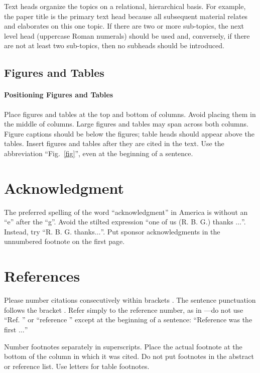 \documentclass[conference]{IEEEtran}
\begin{document}
Text heads organize the topics on a relational, hierarchical basis. For 
example, the paper title is the primary text head because all subsequent 
material relates and elaborates on this one topic. If there are two or more 
sub-topics, the next level head (uppercase Roman numerals) should be used 
and, conversely, if there are not at least two sub-topics, then no subheads 
should be introduced.

\subsection{Figures and Tables}
\paragraph{Positioning Figures and Tables} Place figures and tables at the top and 
bottom of columns. Avoid placing them in the middle of columns. Large 
figures and tables may span across both columns. Figure captions should be 
below the figures; table heads should appear above the tables. Insert 
figures and tables after they are cited in the text. Use the abbreviation 
``Fig.~\ref{fig}'', even at the beginning of a sentence.



\section*{Acknowledgment}

The preferred spelling of the word ``acknowledgment'' in America is without 
an ``e'' after the ``g''. Avoid the stilted expression ``one of us (R. B. 
G.) thanks $\ldots$''. Instead, try ``R. B. G. thanks$\ldots$''. Put sponsor 
acknowledgments in the unnumbered footnote on the first page.

\section*{References}

Please number citations consecutively within brackets \cite{b1}. The 
sentence punctuation follows the bracket \cite{b2}. Refer simply to the reference 
number, as in \cite{b3}---do not use ``Ref. \cite{b3}'' or ``reference \cite{b3}'' except at 
the beginning of a sentence: ``Reference \cite{b3} was the first $\ldots$''

Number footnotes separately in superscripts. Place the actual footnote at 
the bottom of the column in which it was cited. Do not put footnotes in the 
abstract or reference list. Use letters for table footnotes.
\end{document}
